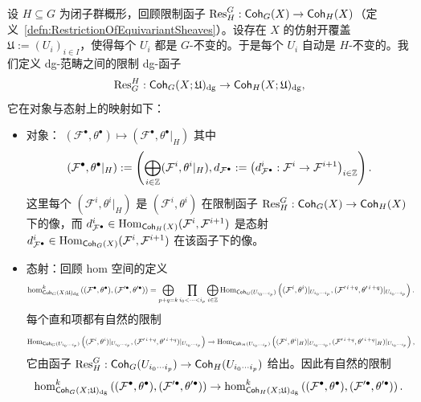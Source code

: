 \begin{defn}[限制 dg-函子]
设 $H\subseteq G$ 为闭子群概形，回顾限制函子 $\operatorname{\mathrm{Res}}^G_H:\operatorname{\mathsf{Coh}}_G(X)\rightarrow\operatorname{\mathsf{Coh}}_H(X)$（定义~\ref{defn:RestrictionOfEquivariantSheaves}）。设存在 $X$ 的仿射开覆盖 $\mathfrak U:=(U_i)_{i\in I}$，使得每个 $U_i$ 都是 $G$-不变的。于是每个 $U_i$ 自动是 $H$-不变的。我们定义 dg-范畴之间的限制 dg-函子
$$
\operatorname{\mathrm{Res}}_G^H:\operatorname{\mathsf{Coh}}_G(X;\mathfrak{U})_{\operatorname{\operatorname{dg}}}\rightarrow\operatorname{\mathsf{Coh}}_H(X;\mathfrak{U})_{\operatorname{\operatorname{dg}}},
$$
它在对象与态射上的映射如下：
\begin{itemize}
\item
对象：
$
(\mathcal{F}^{\bullet},\theta^{\bullet})
\mapsto
(\mathcal{F}^{\bullet},\theta^{\bullet}|_H)
$
其中
$$
(\mathcal{F}^{\bullet},\theta^{\bullet}|_H)
:=
\left(
\bigoplus_{\operatorname{{\text{$i$}}}\in\mathbb Z}
(\mathcal F^{\operatorname{{\text{$i$}}}},\theta^{\operatorname{{\text{$i$}}}}|_H),
d_{\mathcal F^\bullet}
:=
\left(d_{\mathcal{F}^{\bullet}}^i:\mathcal{F}^i\rightarrow\mathcal{F}^{i+1}\right)_{i\in\mathbb{Z}}
\right).
$$
这里每个 $(\mathcal{F}^i,\theta^i|_H)$ 是 $(\mathcal{F}^i,\theta^i)$ 在限制函子 $\operatorname{\mathrm{Res}}^G_H:\operatorname{\mathsf{Coh}}_G(X)\rightarrow\operatorname{\mathsf{Coh}}_H(X)$ 下的像，而 $d_{\mathcal{F}^{\bullet}}^i\in\operatorname{\operatorname{Hom}}_{\operatorname{\mathsf{Coh}}_H(X)}(\mathcal F^i,\mathcal F^{i+1})$ 是态射 $d_{\mathcal{F}^{\bullet}}^i\in\operatorname{\operatorname{Hom}}_{\operatorname{\mathsf{Coh}}_G(X)}(\mathcal F^i,\mathcal F^{i+1})$ 在该函子下的像。
\item
态射：回顾 hom 空间的定义
\[
\resizebox{\linewidth}{!}{$\displaystyle
\hom_{\Coh_G(X;\mathfrak U)_{\dg}}^{\homdegree}
\left(
(\mathcal F^\bullet,\theta^\bullet),
(\mathcal F'^\bullet,\theta'^\bullet)
\right)
=
\bigoplus_{p+q=\homdegree}
\prod_{i_0<\cdots<i_p}
\bigoplus_{\objectdegree\in\mathbb Z}
\Hom_{\Coh_G(U_{i_0\cdots i_p})}
\left(
(\mathcal F^{\objectdegree},\theta^{\objectdegree})
|_{U_{i_0\cdots i_p}},
(\mathcal F'^{\objectdegree+q},\theta'^{\objectdegree+q})
|_{U_{i_0\cdots i_p}}
\right).$}
\]
每个直和项都有自然的限制
\[
\resizebox{\linewidth}{!}{$\displaystyle
\Hom_{\Coh_G(U_{i_0\cdots i_p})}
\left(
(\mathcal F^{\objectdegree},\theta^{\objectdegree})
|_{U_{i_0\cdots i_p}},
(\mathcal F'^{\objectdegree+q},\theta'^{\objectdegree+q})
|_{U_{i_0\cdots i_p}}
\right)
\rightarrow
\Hom_{\Coh_H(U_{i_0\cdots i_p})}
\left(
(\mathcal F^{\objectdegree},\theta^{\objectdegree}|_H)
|_{U_{i_0\cdots i_p}},
(\mathcal F'^{\objectdegree+q},\theta'^{\objectdegree+q}|_H)
|_{U_{i_0\cdots i_p}}
\right),$}
\]
它由函子 $\operatorname{\mathrm{Res}}^G_H:\operatorname{\mathsf{Coh}}_G(U_{i_0\cdots i_p})\rightarrow\operatorname{\mathsf{Coh}}_H(U_{i_0\cdots i_p})$ 给出。因此有自然的限制
$$
\hom_{\operatorname{\mathsf{Coh}}_G(X;\mathfrak U)_{\operatorname{\operatorname{dg}}}}^{\operatorname{{\text{$k$}}}}
\left(
(\mathcal F^\bullet,\theta^\bullet),
(\mathcal F'^\bullet,\theta'^\bullet)
\right)
\rightarrow
\hom_{\operatorname{\mathsf{Coh}}_H(X;\mathfrak U)_{\operatorname{\operatorname{dg}}}}^{\operatorname{{\text{$k$}}}}
\left(
(\mathcal F^\bullet,\theta^\bullet),
(\mathcal F'^\bullet,\theta'^\bullet)
\right).
$$
\end{itemize}
\end{defn}

